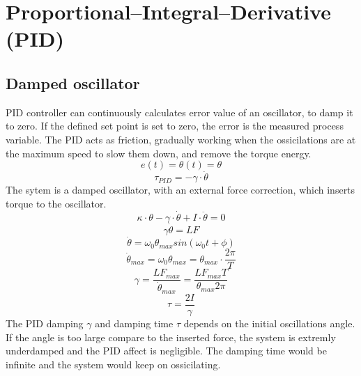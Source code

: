 \documentclass[\main/master.tex]{subfiles}
\begin{document}
\section{Proportional–Integral–Derivative (PID)}
\subsection{Damped oscillator}
PID controller can continuously calculates error value of an oscillator, to damp it to zero. If the defined set point is set to zero, the error is the measured process variable. The PID acts as friction, gradually working when the ossicilations are at the maximum speed to slow them down, and remove the torque energy.
\begin{equation}
e(t) = \theta(t) = \theta   \label{eqn:error}
\end{equation}
\begin{equation}
\tau_{PID} = -\gamma\cdot\dot{\theta}   \label{eqn:friction_torque}
\end{equation}
The sytem is a damped oscillator, with an external force correction, which inserts torque to the oscillator.
\begin{equation}
\kappa\cdot\theta - \gamma\cdot\dot{\theta}  + I\cdot\ddot{\theta} = 0   \label{eqn:damped__pid_motion_equation}
\end{equation}
\begin{equation}
\gamma\dot{\theta}  = LF   \label{eqn:damped__pid_motion_equation}
\end{equation}
\begin{equation}
\dot{\theta} = \omega_0\theta_{max}sin(\omega_0 t +\phi)    \label{eqn:undamped_motion_equation}
\end{equation}
\begin{equation}
\dot{\theta}_{max} = \omega_0\theta_{max} = \theta_{max}\cdot\frac{2\pi}{T}    \label{eqn:undamped_motion_equation}
\end{equation}
\begin{equation}
\gamma  = \frac{LF_{max}}{\dot{\theta}_{max}} =\frac{LF_{max}T}{\theta_{max}2\pi}    \label{eqn:damped_pid_motion_equation}
\end{equation}
\begin{equation}
\tau =  \frac{2I}{\gamma}  \label{eqn:damping_time}
\end{equation}
The PID damping $\gamma$ and damping time $\tau$ depends on the initial oscillations angle. If the angle is too large compare to the inserted force, the system is extremly underdamped and the PID affect is negligible. The damping time would be infinite and the system would keep on ossicilating.
\end{document}
